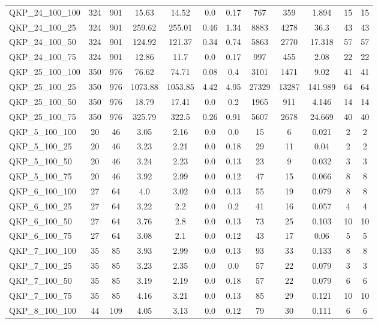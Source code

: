 \begin{table}[!h]
{\begin{tabular}{lccccccccccc}
QKP\_24\_100\_100 & 324 & 901 & 15.63 & 14.52 & 0.0 & 0.17 & 767 & 359 & 1.894 & 15 & 15\\
QKP\_24\_100\_25 & 324 & 901 & 259.62 & 255.01 & 0.46 & 1.34 & 8883 & 4278 & 36.3 & 43 & 43\\
QKP\_24\_100\_50 & 324 & 901 & 124.92 & 121.37 & 0.34 & 0.74 & 5863 & 2770 & 17.318 & 57 & 57\\
QKP\_24\_100\_75 & 324 & 901 & 12.86 & 11.7 & 0.0 & 0.17 & 997 & 455 & 2.08 & 22 & 22\\
QKP\_25\_100\_100 & 350 & 976 & 76.62 & 74.71 & 0.08 & 0.4 & 3101 & 1471 & 9.02 & 41 & 41\\
QKP\_25\_100\_25 & 350 & 976 & 1073.88 & 1053.85 & 4.42 & 4.95 & 27329 & 13287 & 141.989 & 64 & 64\\
QKP\_25\_100\_50 & 350 & 976 & 18.79 & 17.41 & 0.0 & 0.2 & 1965 & 911 & 4.146 & 14 & 14\\
QKP\_25\_100\_75 & 350 & 976 & 325.79 & 322.5 & 0.26 & 0.91 & 5607 & 2678 & 24.669 & 40 & 40\\
QKP\_5\_100\_100 & 20 & 46 & 3.05 & 2.16 & 0.0 & 0.0 & 15 & 6 & 0.021 & 2 & 2\\
QKP\_5\_100\_25 & 20 & 46 & 3.23 & 2.21 & 0.0 & 0.18 & 29 & 11 & 0.04 & 2 & 2\\
QKP\_5\_100\_50 & 20 & 46 & 3.24 & 2.23 & 0.0 & 0.13 & 23 & 9 & 0.032 & 3 & 3\\
QKP\_5\_100\_75 & 20 & 46 & 3.92 & 2.99 & 0.0 & 0.12 & 47 & 15 & 0.066 & 8 & 8\\
QKP\_6\_100\_100 & 27 & 64 & 4.0 & 3.02 & 0.0 & 0.13 & 55 & 19 & 0.079 & 8 & 8\\
QKP\_6\_100\_25 & 27 & 64 & 3.22 & 2.2 & 0.0 & 0.2 & 41 & 16 & 0.057 & 4 & 4\\
QKP\_6\_100\_50 & 27 & 64 & 3.76 & 2.8 & 0.0 & 0.13 & 73 & 25 & 0.103 & 10 & 10\\
QKP\_6\_100\_75 & 27 & 64 & 3.08 & 2.1 & 0.0 & 0.12 & 43 & 17 & 0.06 & 5 & 5\\
QKP\_7\_100\_100 & 35 & 85 & 3.93 & 2.99 & 0.0 & 0.13 & 93 & 33 & 0.133 & 8 & 8\\
QKP\_7\_100\_25 & 35 & 85 & 3.23 & 2.35 & 0.0 & 0.0 & 57 & 22 & 0.079 & 3 & 3\\
QKP\_7\_100\_50 & 35 & 85 & 3.19 & 2.19 & 0.0 & 0.18 & 57 & 22 & 0.079 & 6 & 6\\
QKP\_7\_100\_75 & 35 & 85 & 4.16 & 3.21 & 0.0 & 0.13 & 85 & 29 & 0.121 & 10 & 10\\
QKP\_8\_100\_100 & 44 & 109 & 4.05 & 3.13 & 0.0 & 0.12 & 79 & 30 & 0.111 & 6 & 6\\

\end{tabular}}
\end{table}
